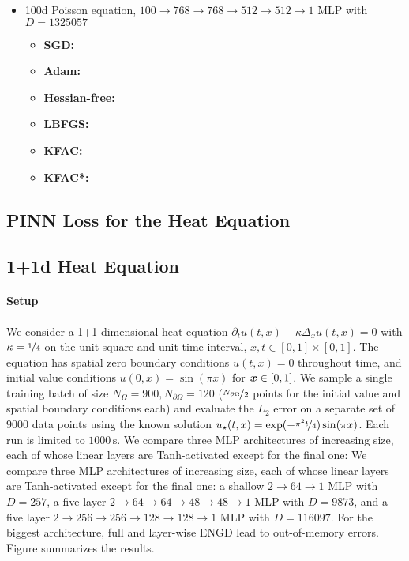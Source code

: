 \begin{itemize}
\item 100d Poisson equation, $100 \to 768 \to 768 \to 512 \to 512 \to 1$ MLP with $D=\num{1325057}$
  \begin{itemize}
    \def\pathToRuns{../kfac_pinns_exp/exp14_poisson_100d_weinan/tex}
  \item \textbf{SGD:} 
  \item \textbf{Adam:} 
  \item \textbf{Hessian-free:} 
  \item \textbf{LBFGS:} 
  \item \textbf{KFAC:} 
  \item \textbf{KFAC*:} 
  \end{itemize}
\end{itemize}

\subsection{PINN Loss for the Heat Equation}


\subsection{1+1d Heat Equation}

\paragraph{Setup} We consider a 1+1-dimensional heat equation $\partial_tu(t,x) - \kappa \Delta_{x} u(t, x) = 0$ with $\kappa = \nicefrac{1}{4}$ on the unit square and unit time interval, $x, t \in [0,1] \times [0,1]$.
The equation has spatial zero boundary conditions $u(t, x) = 0$ throughout time, and initial value conditions $u(0, x) = \sin(\pi x)$ for ${\bm{x}} \in [0,1]$.
We sample a single training batch of size $N_{\Omega} = \num{900}, N_{\partial\Omega} = 120$ ($\nicefrac{N_{\partial\Omega}}{2}$ points for the initial value and spatial boundary conditions each) and evaluate the $L_2$ error on a separate set of $\num{9000}$ data points using the known solution $u_{\star}(t, x) = \exp(-\nicefrac{\pi^2t}{4}) \sin(\pi x)$.
Each run is limited to $\num{1000}\,\text{s}$.
We compare three MLP architectures of increasing size, each of whose linear layers are Tanh-activated except for the final one: We compare three MLP architectures of increasing size, each of whose linear layers are Tanh-activated except for the final one: a shallow $2\to 64\to 1$ MLP with $D=257$, a five layer $2 \to 64 \to 64 \to 48 \to 48 \to 1$ MLP with $D=\num{9873}$, and a five layer $2 \to 256 \to 256\to 128 \to 128 \to 1$ MLP with $D=\num{116097}$.
For the biggest architecture, full and layer-wise ENGD lead to out-of-memory errors.
Figure  summarizes the results.

